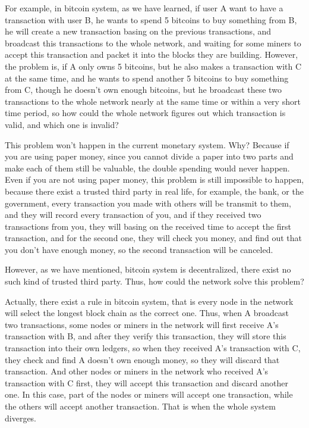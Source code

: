 \documentclass[12pt,a4paper]{article}
\begin{document}
 For example, in bitcoin system, as we have learned, if user A want to have a transaction with user B, he wants to spend 5 bitcoins to buy something from B, he will create a new transaction basing on the previous transactions, and broadcast this transactions to the whole network, and waiting for some miners to accept this transaction and packet it into the blocks they are building. However, the problem is, if A only owns 5 bitcoins, but he also makes a transaction with C at the same time, and he wants to spend another 5 bitcoins to buy something from C, though he doesn't own enough bitcoins, but he broadcast these two transactions to the whole network nearly at the same time or within a very short time period, so how could the whole network figures out which transaction is valid, and which one is invalid? 
 
 This problem won't happen in the current monetary system. Why? Because if you are using paper money, since you cannot divide a paper into two parts and make each of them still be valuable, the double spending would never happen. Even if you are not using paper money, this problem is still impossible to happen, because there exist a trusted third party in real life, for example, the bank, or the government, every transaction you made with others will be transmit to them, and they will record every transaction of you, and if they received two transactions from you, they will basing on the received time to accept the first transaction, and for the second one, they will check you money, and find out that you don't have enough money, so the second transaction will be canceled.
 
 However, as we have mentioned, bitcoin system is decentralized, there exist no such kind of trusted third party. Thus, how could the network solve this problem?
 
 Actually, there exist a rule in bitcoin system, that is every node in the network will select the longest block chain as the correct one. Thus, when A broadcast two transactions, some nodes or miners in the network will first receive A's transaction with B, and after they verify this transaction, they will store this transaction into their own ledgers, so when they received A's transaction with C, they check and find A doesn't own enough money, so they will discard that transaction. And other nodes or miners in the network who received A's transaction with C first, they will accept this transaction and discard another one. In this case, part of the nodes or miners will accept one transaction, while the others will accept another transaction. That is when the whole system diverges.
 
\end{document}
